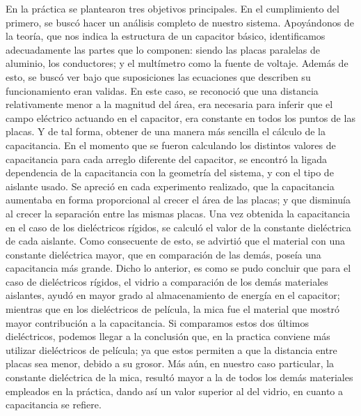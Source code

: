 \documentclass[letterpaper, 11 pt]{article}
\begin{document}
\begin{multicols}{2}
En la práctica se plantearon tres objetivos principales. En el cumplimiento del primero, se buscó hacer un análisis completo de nuestro sistema. Apoyándonos de la teoría, que nos indica la estructura de un capacitor básico, identificamos adecuadamente las partes que lo componen: siendo las placas paralelas de aluminio, los conductores; y el multímetro como la fuente de voltaje.
Además de esto, se buscó ver bajo que suposiciones las ecuaciones que describen su funcionamiento eran validas. En este caso, se reconoció que una distancia relativamente menor a la magnitud del área, era necesaria para inferir que el campo eléctrico actuando en el capacitor, era constante en todos los puntos de las placas. Y de tal forma, obtener de una manera más sencilla el cálculo de la capacitancia. 
En el momento que se fueron calculando los distintos valores de capacitancia para cada arreglo diferente del capacitor, se encontró la ligada dependencia de la capacitancia con la geometría del sistema, y con el tipo de aislante usado. Se apreció en cada experimento realizado, que la capacitancia aumentaba en forma proporcional al crecer el área de las placas; y que disminuía al crecer la separación entre las mismas placas. Una vez obtenida la capacitancia en el caso de los dieléctricos rígidos, se calculó el valor de la constante dieléctrica de cada aislante. Como consecuente de esto, se advirtió que el material con una constante dieléctrica mayor, que en comparación de las demás, poseía una capacitancia más grande. Dicho lo anterior, es como se pudo concluir que para el caso de dieléctricos rígidos, el vidrio a comparación de los demás materiales aislantes, ayudó en mayor grado al almacenamiento de energía en el capacitor; mientras que en los dieléctricos de película, la mica fue el material que mostró mayor contribución a la capacitancia. Si comparamos estos dos últimos dieléctricos, podemos llegar a la conclusión que, en la practica conviene más utilizar dieléctricos de película; ya que estos permiten a que la distancia entre placas sea menor, debido a su grosor. Más aún, en nuestro caso particular, la constante dieléctrica de la mica, resultó mayor a la de todos los demás materiales empleados en la práctica, dando así un valor superior al del vidrio, en cuanto a capacitancia se refiere.


\end{multicols}
\end{document}
